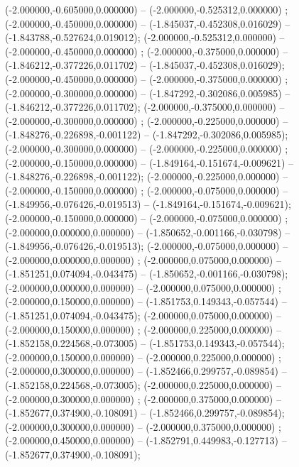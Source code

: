  (-2.000000,-0.605000,0.000000) -- (-2.000000,-0.525312,0.000000) ;
 (-2.000000,-0.450000,0.000000) -- (-1.845037,-0.452308,0.016029) -- (-1.843788,-0.527624,0.019012);
 (-2.000000,-0.525312,0.000000) -- (-2.000000,-0.450000,0.000000) ;
 (-2.000000,-0.375000,0.000000) -- (-1.846212,-0.377226,0.011702) -- (-1.845037,-0.452308,0.016029);
 (-2.000000,-0.450000,0.000000) -- (-2.000000,-0.375000,0.000000) ;
 (-2.000000,-0.300000,0.000000) -- (-1.847292,-0.302086,0.005985) -- (-1.846212,-0.377226,0.011702);
 (-2.000000,-0.375000,0.000000) -- (-2.000000,-0.300000,0.000000) ;
 (-2.000000,-0.225000,0.000000) -- (-1.848276,-0.226898,-0.001122) -- (-1.847292,-0.302086,0.005985);
 (-2.000000,-0.300000,0.000000) -- (-2.000000,-0.225000,0.000000) ;
 (-2.000000,-0.150000,0.000000) -- (-1.849164,-0.151674,-0.009621) -- (-1.848276,-0.226898,-0.001122);
 (-2.000000,-0.225000,0.000000) -- (-2.000000,-0.150000,0.000000) ;
 (-2.000000,-0.075000,0.000000) -- (-1.849956,-0.076426,-0.019513) -- (-1.849164,-0.151674,-0.009621);
 (-2.000000,-0.150000,0.000000) -- (-2.000000,-0.075000,0.000000) ;
 (-2.000000,0.000000,0.000000) -- (-1.850652,-0.001166,-0.030798) -- (-1.849956,-0.076426,-0.019513);
 (-2.000000,-0.075000,0.000000) -- (-2.000000,0.000000,0.000000) ;
 (-2.000000,0.075000,0.000000) -- (-1.851251,0.074094,-0.043475) -- (-1.850652,-0.001166,-0.030798);
 (-2.000000,0.000000,0.000000) -- (-2.000000,0.075000,0.000000) ;
 (-2.000000,0.150000,0.000000) -- (-1.851753,0.149343,-0.057544) -- (-1.851251,0.074094,-0.043475);
 (-2.000000,0.075000,0.000000) -- (-2.000000,0.150000,0.000000) ;
 (-2.000000,0.225000,0.000000) -- (-1.852158,0.224568,-0.073005) -- (-1.851753,0.149343,-0.057544);
 (-2.000000,0.150000,0.000000) -- (-2.000000,0.225000,0.000000) ;
 (-2.000000,0.300000,0.000000) -- (-1.852466,0.299757,-0.089854) -- (-1.852158,0.224568,-0.073005);
 (-2.000000,0.225000,0.000000) -- (-2.000000,0.300000,0.000000) ;
 (-2.000000,0.375000,0.000000) -- (-1.852677,0.374900,-0.108091) -- (-1.852466,0.299757,-0.089854);
 (-2.000000,0.300000,0.000000) -- (-2.000000,0.375000,0.000000) ;
 (-2.000000,0.450000,0.000000) -- (-1.852791,0.449983,-0.127713) -- (-1.852677,0.374900,-0.108091);
